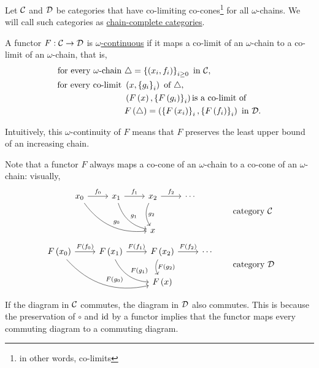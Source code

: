 \begin{enumcirc}
	\item
	Let $\mathcal{C}$ and $\mathcal{D}$ be categories that have {co-limiting co-cones}\footnote{in
		other words, co-limits} for all $\omega$-chains.
	We will call such categories as \ul{chain-complete categories}.
	\item
	A functor $F: \mathcal{C} \to \mathcal{D}$ is \ul{$\omega$-continuous} if it maps a co-limit of
	an $\omega$-chain to a co-limit of an $\omega$-chain, that is,
	\begin{align*}
		\textrm{for every } \omega\textrm{-chain } & \triangle = \left\{ \left( x_i, f_i \right) \right\}_{i \ge 0} \textrm{ in } \mathcal{C},                               \\
		\textrm{for every co-limit }               & \left( x, \left\{ g_i \right\}_i \right) \textrm{ of } \triangle,                                               \\
		                                           & \left( F\left( x \right), \left\{ F\left( g_i \right) \right\}_i \right) \textrm {is a co-limit of }                          \\
		                                           & F\left( \triangle \right) = \left( \left\{ F\left( x_i \right) \right\}_i, \left\{ F\left( f_i \right) \right\}_i \right) \textrm{ in } \mathcal{D}.
	\end{align*}
	\item
	Intuitively, this $\omega$-continuity of $F$ means that $F$ preserves the least
	upper bound of an increasing chain.
	\item
	Note that a functor $F$ always maps a co-cone of an $\omega$-chain to a co-cone
	of an $\omega$-chain: visually,
	\[
		\qquad \quad
		\begin{tikzcd}[row sep=large]
			x_0 \arrow[r, "f_0"] \arrow[drr, "g_0", bend right = 30] &
			x_1 \arrow[r, "f_1"] \arrow[dr, "g_1", bend right = 30] &
			x_2 \arrow[r, "f_2"] \arrow[d, "g_2", bend right = 30] & \cdots \\
			& & x
		\end{tikzcd}
		\qquad \qquad
		\textrm{category } \Cc
	\]
	\[
		\begin{tikzcd}
			F\prths{x_0} \arrow[r, "F\prths{f_0}"] \arrow[drr, "F\prths{g_0}", bend right = 30] &
			F\prths{x_1} \arrow[r, "F\prths{f_1}"] \arrow[dr, "F\prths{g_1}", bend right = 30] &
			F\prths{x_2} \arrow[r, "F\prths{f_2}"] \arrow[d, "F\prths{g_2}", bend right = 30] & \cdots \\
			& & F\prths{x}
		\end{tikzcd}
		\qquad
		\textrm{category } \Dc
	\]
	If the diagram in $\mathcal{C}$ commutes, the diagram in $\mathcal{D}$ also commutes.
	This is because the preservation of $\circ$ and $\textrm{id}$ by a functor implies that
	the functor maps every commuting diagram to a commuting diagram.


\end{enumcirc}
